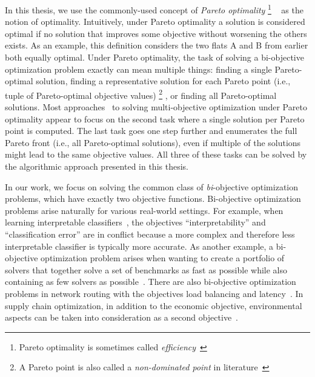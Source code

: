 In this thesis, we use the commonly-used concept of \emph{Pareto optimality}%
\footnote{Pareto optimality is sometimes called \emph{efficiency}~\autocite{Ehrgott2005-2,DBLP:journals/siamjo/SantisENR20}}%
~\autocite{Ehrgott2005-2} as the notion of optimality.
Intuitively, under Pareto optimality a solution is considered optimal if no solution that improves some objective without worsening the others exists.
As an example, this definition considers the two flats A and B from earlier both equally optimal.
Under Pareto optimality, the task of solving a bi-objective optimization problem exactly can mean multiple things:
finding a single Pareto-optimal solution, finding a representative solution for each Pareto point (i.e., tuple of Pareto-optimal objective values)%
\footnote{A Pareto point is also called a \emph{non-dominated point} in literature~\autocite{Ehrgott2005-2}}%
, or finding all Pareto-optimal solutions.
Most approaches~\autocite{DBLP:conf/cp/SohBTB17,DBLP:conf/cp/JanotaMSM21,DBLP:conf/ijcai/Terra-NevesLM18a} to solving multi-objective optimization under Pareto optimality appear to focus on the second task where a single solution per Pareto point is computed.
The last task goes one step further and enumerates the full Pareto front (i.e., all Pareto-optimal solutions), even if multiple of the solutions might lead to the same objective values.
All three of these tasks can be solved by the algorithmic approach presented in this thesis.

In our work, we focus on solving the common class of \emph{bi}-objective optimization problems, which have exactly two objective functions.
Bi-objective optimization problems arise naturally for various real-world settings.
For example, when learning interpretable classifiers~\autocites{DBLP:conf/ijcai/Ignatiev0NS21,DBLP:conf/cp/MaliotovM18,DBLP:conf/ijcai/NarodytskaIPM18,DBLP:conf/ijcai/Hu0HH20,DBLP:journals/corr/abs-2010-09919,DBLP:conf/cp/YuISB20,DBLP:conf/aaai/Ignatiev0S021,DBLP:conf/cade/IgnatievPNM18}, the objectives ``interpretability'' and ``classification error'' are in conflict because a more complex and therefore less interpretable classifier is typically more accurate.
As another example, a bi-objective optimization problem arises when wanting to create a portfolio of solvers that together solve a set of benchmarks as fast as possible while also containing as few solvers as possible~\autocite{DBLP:conf/cp/JanotaMSM21}.
There are also bi-objective optimization problems in network routing with the objectives load balancing and latency~\autocite{SilverioEtAl2022biobjectiveoptimization}.
In supply chain optimization, in addition to the economic objective, environmental aspects can be taken into consideration as a second objective~\autocites{DBLP:journals/cce/Pinto-VarelaBN11,DBLP:journals/candie/TautenhainBN19}.

